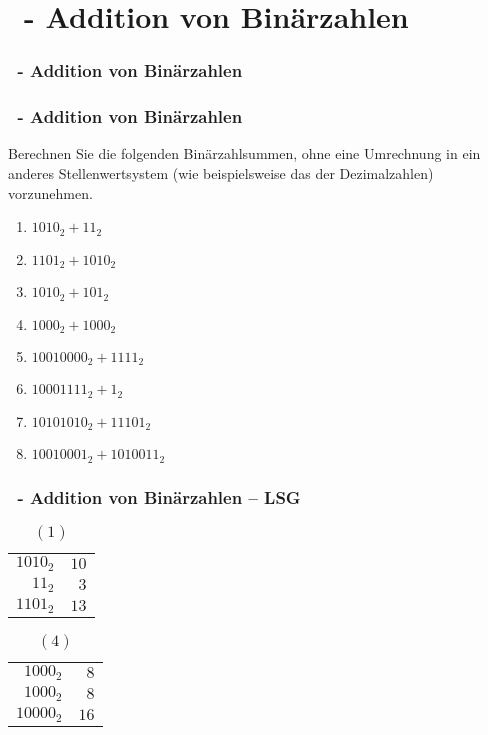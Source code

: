 \def\stitle{\theexercise\ - Addition von Binärzahlen}
\section{\stitle}
\begin{frame}[t]%
  \frametitle{\stitle}
\tableofcontents[current]
\end{frame}

\begin{frame}[fragile]%
    \frametitle{\stitle}%
    
Berechnen Sie die folgenden Binärzahlsummen, ohne eine Umrechnung in ein anderes Stellenwertsystem (wie beispielsweise das der Dezimalzahlen) vorzunehmen.
\begin{center}
\begin{minipage}{0.45\textwidth}
\begin{enumerate}
\item $1010_2 +   11_2$
\item $1101_2 + 1010_2$
\item $1010_2 +  101_2$
\item $1000_2 + 1000_2$
\end{enumerate}
\end{minipage}
\begin{minipage}{0.45\textwidth}
\begin{enumerate}
\setcounter{enumi}{4}
\item $10010000_2 + 1111_2$
\item $10001111_2 + 1_2$
\item $10101010_2 + 11101_2$
\item $10010001_2 + 1010011_2$
\end{enumerate}
\end{minipage}
\end{center}

\end{frame}


\def\stitle{\theexercise\ - Addition von Binärzahlen -- LSG}
\begin{frame}
  \frametitle{\stitle}
\medskip

\begin{table}
\caption{$(1)$}
\begin{tabular}{r||r}
${1010}_2$ & $10$ \\
${11}_2$   & $3$  \\ \hline
${1101}_2$ & $13$
\end{tabular}
\end{table}

\begin{table}
\caption{$(4)$}
\begin{tabular}{r||r}
${1000}_2$  & $8$ \\
${1000}_2$  & $8$  \\ \hline
${10000}_2$ & $16$
\end{tabular}
\end{table}
\end{frame}
